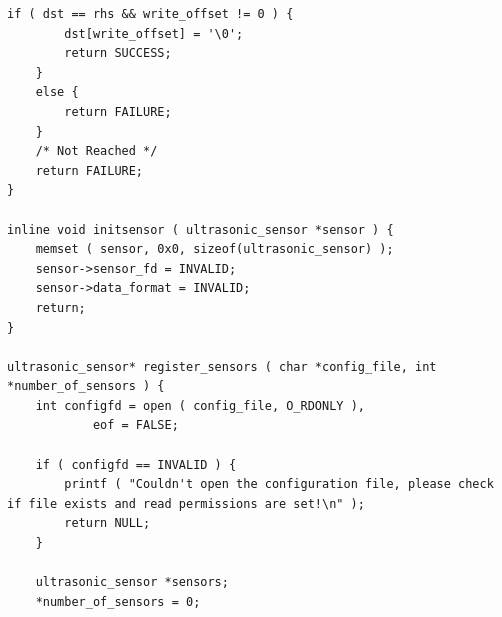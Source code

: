\documentclass[12pt]{article}
\begin{document}
\begin{lstlisting}[caption="obstacledetect.c - Obstacle Detection source"]
	if ( dst == rhs && write_offset != 0 ) { 
		dst[write_offset] = '\0'; 
		return SUCCESS; 
	} 
	else { 
		return FAILURE; 
	} 
	/* Not Reached */ 
	return FAILURE; 
} 

inline void initsensor ( ultrasonic_sensor *sensor ) { 
	memset ( sensor, 0x0, sizeof(ultrasonic_sensor) ); 
	sensor->sensor_fd = INVALID; 
	sensor->data_format = INVALID; 
	return; 
} 

ultrasonic_sensor* register_sensors ( char *config_file, int *number_of_sensors ) { 
	int configfd = open ( config_file, O_RDONLY ), 
			eof = FALSE; 

	if ( configfd == INVALID ) { 
		printf ( "Couldn't open the configuration file, please check if file exists and read permissions are set!\n" ); 
		return NULL; 
	} 

	ultrasonic_sensor *sensors; 
	*number_of_sensors = 0; 


\end{lstlisting}
\end{document}
